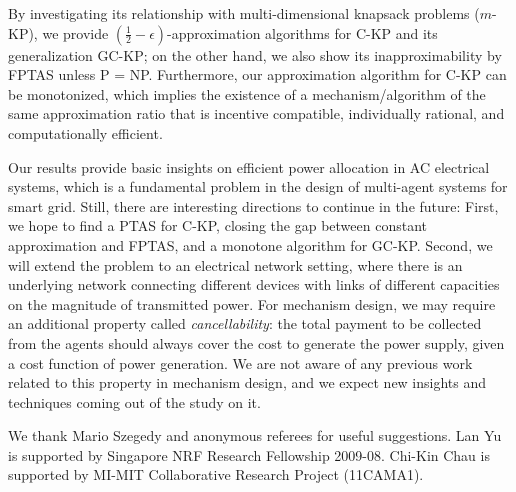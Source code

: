 \documentclass{aamas2013}
\begin{document}
By investigating its relationship with multi-dimensional knapsack problems ($m$-KP), we provide $(\frac{1}{2}-\epsilon)$-approximation algorithms for C-KP and its generalization GC-KP; on the other hand, we also show its inapproximability by FPTAS unless P = NP.  Furthermore, our approximation algorithm for C-KP can be monotonized, which implies the existence of a mechanism/algorithm of the same approximation ratio that is incentive compatible, individually rational, and computationally efficient.                

Our results provide basic insights on efficient power allocation in AC electrical systems, which is a fundamental problem in the design of multi-agent systems for smart grid.
Still, there are interesting directions to continue in the future: First, we hope to find a PTAS for C-KP, closing the gap between constant approximation and FPTAS, and a monotone algorithm for GC-KP.  Second, we will extend the problem to an electrical network setting, where there is an underlying network connecting different devices with links of different capacities on the magnitude of transmitted power.  For mechanism design, we may require an additional property called {\em cancellability}: the total payment to be collected from the agents should always cover the cost to generate the power supply, given a cost function of power generation.  We are not aware of any previous work related to this property in mechanism design, and we expect new insights and techniques coming out of the study on it.       

\medskip
{} 
We thank Mario Szegedy and anonymous referees for useful suggestions.  Lan Yu is supported by Singapore NRF Research Fellowship 2009-08.  Chi-Kin Chau is supported by MI-MIT Collaborative Research Project (11CAMA1).


\end{document}
